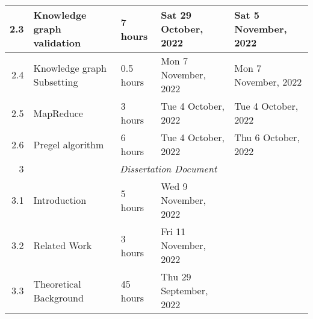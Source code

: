 \documentclass{standalone}
\begin{document}
\begin{tabular}{|r|llll|}
    2.3                                                       & \multicolumn{1}{l|}{Knowledge graph validation}                 & \multicolumn{1}{l|}{7 hours}                                   & \multicolumn{1}{l|}{Sat 29 October, 2022}                   & Sat 5 November, 2022                                         \\ \hline
    2.4                                                       & \multicolumn{1}{l|}{Knowledge graph Subsetting}                 & \multicolumn{1}{l|}{0.5 hours}                                 & \multicolumn{1}{l|}{Mon 7 November, 2022}                   & Mon 7 November, 2022                                         \\ \hline
    2.5                                                       & \multicolumn{1}{l|}{MapReduce}                                  & \multicolumn{1}{l|}{3 hours}                                   & \multicolumn{1}{l|}{Tue 4 October, 2022}                    & Tue 4 October, 2022                                          \\ \hline
    2.6                                                       & \multicolumn{1}{l|}{Pregel algorithm}                           & \multicolumn{1}{l|}{6 hours}                                   & \multicolumn{1}{l|}{Tue 4 October, 2022}                    & Thu 6 October, 2022                                          \\ \hline
    3                                                         & \multicolumn{4}{c|}{\textit{Dissertation Document}}                                                                                                                                                                                                           \\ \hline
    3.1                                                       & \multicolumn{1}{l|}{Introduction}                               & \multicolumn{1}{l|}{5 hours}                                   & \multicolumn{1}{l|}{Wed 9 November, 2022}                   &                                                              \\ \hline
    3.2                                                       & \multicolumn{1}{l|}{Related Work}                               & \multicolumn{1}{l|}{3 hours}                                   & \multicolumn{1}{l|}{Fri 11 November, 2022}                  &                                                              \\ \hline
    3.3                                                       & \multicolumn{1}{l|}{Theoretical Background}                     & \multicolumn{1}{l|}{45 hours}                                  & \multicolumn{1}{l|}{Thu 29 September, 2022}                 &                                                              \\ \hline

\end{tabular}
\end{document}

